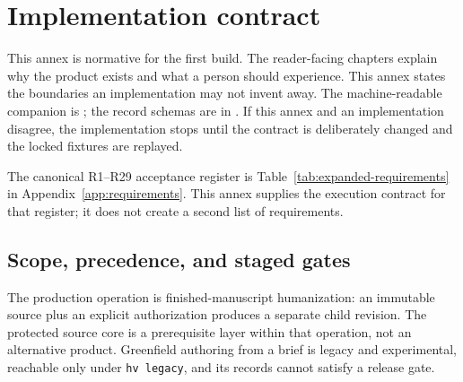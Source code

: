 \chapter{Implementation contract}
\label{app:implementation-contract}

This annex is normative for the first build. The reader-facing chapters explain
why the product exists and what a person should experience. This annex states
the boundaries an implementation may not invent away. The machine-readable
companion is ; the record schemas
are in . If this annex and an implementation disagree, the
implementation stops until the contract is deliberately changed and the locked
fixtures are replayed.

The canonical R1--R29 acceptance register is
Table~\ref{tab:expanded-requirements} in Appendix~\ref{app:requirements}.
This annex supplies the execution contract for that register; it does not
create a second list of requirements.

\section{Scope, precedence, and staged gates}
\label{sec:contract-scope}

The production operation is finished-manuscript humanization: an immutable source
plus an explicit authorization produces a separate child revision. The protected
source core is a prerequisite layer within that operation, not an alternative
product. Greenfield authoring from a brief is legacy and experimental, reachable
only under \texttt{hv legacy}, and its records cannot satisfy a release gate.

